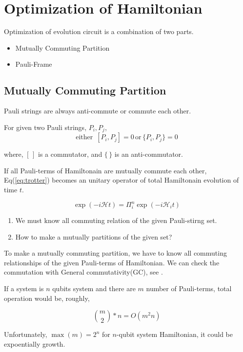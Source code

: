 \documentclass[
11pt,notheorems,hyperref={pdfauthor=Hyunseong Kim}
]{beamer}
\begin{document}
\section{Optimization of Hamiltonian}
\begin{frame}
    Optimization of evolution circuit is a combination of two parts.

    \begin{itemize}
        \item Mutually Commuting Partition 
        \item Pauli-Frame
    \end{itemize}
\end{frame}
\subsection{Mutually Commuting Partition}
\begin{frame}
    Pauli strings are always anti-commute or commute each other.

    For given two Pauli strings, $P_i, P_j$,
    \begin{equation}
        \text{either }\, [P_i, P_j] =0 \, \text{or} \, \{P_i, P_j\} =0
    \end{equation}

    where, $[\,]$ is a commutator, and $\{\,\}$ is an anti-commutator.

    If all Pauli-terms of Hamiltonain are mutually commute each other, 
        Eq(\ref{eq:trotter}) becomes an unitary operator of total Hamiltonain evolution of time $t$.

        \begin{equation}
            \exp(- i \mathcal{H} t) = \Pi_i^n \exp\left(-i \mathcal{H}_i t \right)
        \end{equation}
\end{frame}

\begin{frame}

    \begin{enumerate}
        \item We must know all commuting relation of the given Pauli-stirng set.
        \item How to make a mutually partitions of the given set?
    \end{enumerate}

\end{frame}

\begin{frame}
    To make a mutually commuting partition, we have to know all commuting relationships of the given Pauli-terms of Hamiltonian.
    We can check the commutation with General commutativity(GC), see \cite{9248636}.
    
    If a system is $n$ qubits system and there are $m$ number of Pauli-terms, total operation would be, roughly,

    \begin{equation}
        {m \choose 2} * n = O(m^2 n)
    \end{equation}

    Unfortunately, $\max(m) = 2^n$ for $n$-qubit system Hamiltonian, it could be expoentially growth.
\end{frame}
\end{document}
